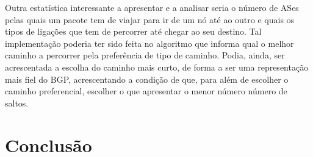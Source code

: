 \documentclass[twocolumn]{article} %
\begin{document}
			\noindent Outra estatística interessante a apresentar e a analisar seria o número de ASes pelas quais um pacote tem de viajar para ir de um nó até ao outro e quais os tipos de ligações que tem de percorrer até chegar ao seu destino. Tal implementação poderia ter sido feita no algoritmo que informa qual o melhor caminho a percorrer pela preferência de tipo de caminho. Podia, ainda, ser acrescentada a escolha do caminho mais curto, de forma a ser uma representação mais fiel do BGP, acrescentando a condição de que, para além de escolher o caminho preferencial, escolher o que apresentar o menor número número de saltos.

	\section{Conclusão}
	
\end{document}
